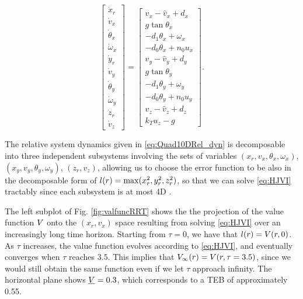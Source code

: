 \begin{equation}
\label{eq:Quad10DRel_dyn}
\begin{bmatrix}
\dot x_r\\
\dot v_x\\
\dot \theta_x\\
\dot\omega_x\\
\dot y_r\\
\dot v_y\\
\dot \theta_y\\
\dot\omega_y\\
\dot z_r\\
\dot v_z
\end{bmatrix} =
\begin{bmatrix}
v_x - \hat v_x + d_x\\
g \tan \theta_x\\
-d_1 \theta_x + \omega_x\\
-d_0 \theta_x + n_0 u_x\\
v_y - \hat v_y + d_y\\
g \tan \theta_y\\
-d_1 \theta_y + \omega_y\\
-d_0 \theta_y + n_0 u_y\\
v_z - \hat v_z + d_z\\
k_T u_z - g
\end{bmatrix}.
\end{equation}


The relative system dynamics given in \eqref{eq:Quad10DRel_dyn} is decomposable into three independent subsystems involving the sets of variables $(x_r, v_x, \theta_x, \omega_x)$, $(x_y, v_y, \theta_y, \omega_y)$, $(z_r, v_z)$, allowing us to choose the error function to be also in the decomposable form of $l(r) = \max(x_r^2, y_r^2, z_r^2)$, so that we can solve \eqref{eq:HJVI} tractably since each subsystem is at most 4D \cite{Chen2016DecouplingJournal}. 

The left subplot of Fig. \ref{fig:valfuncRRT} shows the the projection of the value function $V$ onto the $(x_r, v_x)$ space resulting from solving \eqref{eq:HJVI} over an increasingly long time horizon.
Starting from $\tau=0$, we have that $l(r) = V(r, 0)$.
As $\tau$ increases, the value function evolves according to \eqref{eq:HJVI}, and eventually converges when $\tau$ reaches $3.5$.
This implies that $V_\infty(r) = V(r, \tau=3.5)$, since we would still obtain the same function even if we let $\tau$ approach infinity.
The horizontal plane shows $\underline{V} = 0.3$, which corresponds to a TEB of approximately 0.55.

